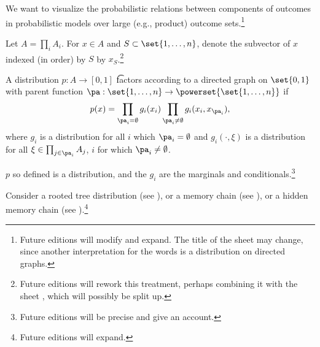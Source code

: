 

We want to visualize the probabilistic relations between components of outcomes in probabilistic models over large (e.g., product) outcome sets.\footnote{Future editions will modify and expand. The title of the sheet may change, since another interpretation for the words  is a distribution on directed graphs.}


Let $A = \prod_{i} A_i$.
For $x \in A$ and $S \subset \set{1, \dots, n}$, denote the subvector of $x$ indexed (in order) by $S$ by $x_S$.\footnote{Future editions will rework this treatment, perhaps combining it with the sheet , which will possibly be split up.}

A distribution $p: A \to [0, 1]$ \t{factors according to a directed graph} on $\set{0, 1}$ with parent function $\pa: \set{1,\dots,n} \to \powerset{\set{1, \dots, n}}$ if
\[
  p(x) = \prod_{\pa_i = \emptyset} g_i(x_i) \prod_{\pa_i \neq \emptyset} g_{i}(x_i, x_{\pa_i}),
\]
where  $g_i$ is a distribution for all $i$ which $\pa_i = \emptyset$ and $g_{i}(\cdot, \xi)$ is a distribution for all $\xi \in \prod_{j \in \pa_i} A_j$, $i$ for which $\pa_i \neq \emptyset$.


\begin{proposition}
  $p$ so defined is a distribution, and the $g_i$ are the marginals and conditionals.\footnote{Future editions will be precise and give an account.}
\end{proposition}


Consider a rooted tree distribution (see ), or a memory chain (see ), or a hidden memory chain (see ).\footnote{Future editions will expand.}

